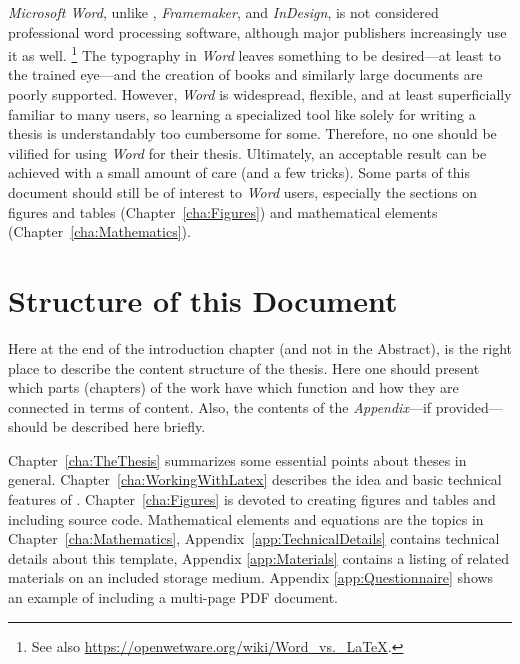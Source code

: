 \emph{Microsoft Word}, unlike \latex, \emph{Framemaker}, and \emph{InDesign},
is not considered professional word processing software, although major
publishers increasingly use it as well.%
\footnote{See also \url{https://openwetware.org/wiki/Word_vs._LaTeX}.}
The typography in \emph{Word} leaves something to be desired---at least to the
trained eye---and the creation of books and similarly large documents are poorly
supported. However, \emph{Word} is widespread, flexible, and at least
superficially familiar to many users, so learning a specialized tool like \latex
solely for writing a thesis is understandably too cumbersome for some.
Therefore, no one should be vilified for using \emph{Word} for their thesis.
Ultimately, an acceptable result can be achieved with a small amount of care
(and a few tricks). Some parts of this document should still be of interest to
\emph{Word} users, especially the sections on figures and tables
(Chapter~\ref{cha:Figures}) and mathematical elements
(Chapter~\ref{cha:Mathematics}).


\section{Structure of this Document}

Here at the end of the introduction chapter (and not in the Abstract), is the
right place to describe the content structure of the thesis. Here one should
present which parts (chapters) of the work have which function and how they are
connected in terms of content. Also, the contents of the \emph{Appendix}---if
provided---should be described here briefly.

Chapter~\ref{cha:TheThesis} summarizes some essential points about theses in
general. Chapter~\ref{cha:WorkingWithLatex} describes the idea and basic
technical features of \latex. Chapter~\ref{cha:Figures} is devoted to creating
figures and tables and including source code. Mathematical elements and
equations are the topics in Chapter~\ref{cha:Mathematics}, \etc
Appendix~\ref{app:TechnicalDetails} contains technical details about this
template, Appendix \ref{app:Materials} contains a listing of related materials
on an included storage medium. Appendix \ref{app:Questionnaire} shows an
example of including a multi-page PDF document.
